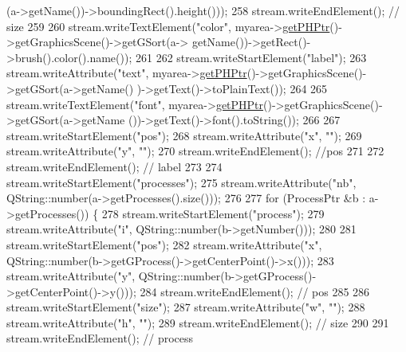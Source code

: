\begin{DoxyCode}
      (a->getName())->boundingRect().height()));
258         stream.writeEndElement(); \textcolor{comment}{// size}
259 
260         stream.writeTextElement(\textcolor{stringliteral}{"color"}, myarea->\hyperlink{classMyArea_a7b94b516e730ddcee16d946c76bbc2b3}{getPHPtr}()->getGraphicsScene()->getGSort(a->
      getName())->getRect()->brush().color().name());
261 
262         stream.writeStartElement(\textcolor{stringliteral}{"label"});
263         stream.writeAttribute(\textcolor{stringliteral}{"text"}, myarea->\hyperlink{classMyArea_a7b94b516e730ddcee16d946c76bbc2b3}{getPHPtr}()->getGraphicsScene()->getGSort(a->getName()
      )->getText()->toPlainText());
264 
265         stream.writeTextElement(\textcolor{stringliteral}{"font"}, myarea->\hyperlink{classMyArea_a7b94b516e730ddcee16d946c76bbc2b3}{getPHPtr}()->getGraphicsScene()->getGSort(a->getName
      ())->getText()->font().toString());
266 
267         stream.writeStartElement(\textcolor{stringliteral}{"pos"});
268         stream.writeAttribute(\textcolor{stringliteral}{"x"}, \textcolor{stringliteral}{""});
269         stream.writeAttribute(\textcolor{stringliteral}{"y"}, \textcolor{stringliteral}{""});
270         stream.writeEndElement(); \textcolor{comment}{//pos}
271 
272         stream.writeEndElement(); \textcolor{comment}{// label}
273 
274         stream.writeStartElement(\textcolor{stringliteral}{"processes"});
275         stream.writeAttribute(\textcolor{stringliteral}{"nb"}, QString::number(a->getProcesses().size()));
276 
277         \textcolor{keywordflow}{for} (ProcessPtr &b : a->getProcesses()) \{
278             stream.writeStartElement(\textcolor{stringliteral}{"process"});
279             stream.writeAttribute(\textcolor{stringliteral}{"i"}, QString::number(b->getNumber()));
280 
281             stream.writeStartElement(\textcolor{stringliteral}{"pos"});
282             stream.writeAttribute(\textcolor{stringliteral}{"x"}, QString::number(b->getGProcess()->getCenterPoint()->x()));
283             stream.writeAttribute(\textcolor{stringliteral}{"y"}, QString::number(b->getGProcess()->getCenterPoint()->y()));
284             stream.writeEndElement(); \textcolor{comment}{// pos}
285 
286             stream.writeStartElement(\textcolor{stringliteral}{"size"});
287             stream.writeAttribute(\textcolor{stringliteral}{"w"}, \textcolor{stringliteral}{""});
288             stream.writeAttribute(\textcolor{stringliteral}{"h"}, \textcolor{stringliteral}{""});
289             stream.writeEndElement(); \textcolor{comment}{// size}
290 
291             stream.writeEndElement(); \textcolor{comment}{// process}

\end{DoxyCode}
